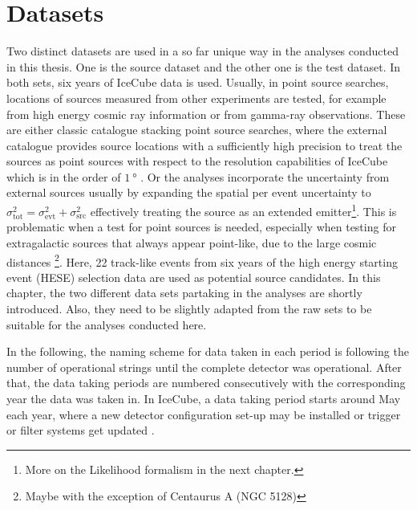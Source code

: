 \chapter{Datasets}
  \label{chp:datasets}

Two distinct datasets are used in a so far unique way in the analyses conducted in this thesis.
One is the source dataset and the other one is the test dataset.
In both sets, six years of IceCube data is used.
Usually, in point source searches, locations of sources measured from other experiments are tested, for example from high energy cosmic ray information or from gamma-ray observations.
These are either classic catalogue stacking point source searches, where the external catalogue provides source locations with a sufficiently high precision to treat the sources as point sources with respect to the resolution capabilities of IceCube which is in the order of $\SI{1}{\degree}$ .
Or the analyses incorporate the uncertainty from external sources usually by expanding the spatial per event uncertainty to $\sigma_\text{tot}^2 = \sigma_\text{evt}^2 + \sigma_\text{src}^2$ effectively treating the source as an extended emitter\footnote{More on the Likelihood formalism in the next chapter.}.
This is problematic when a test for point sources is needed, especially when testing for extragalactic sources that always appear point-like, due to the large cosmic distances \footnote{Maybe with the exception of Centaurus A (NGC 5128) }.
Here, 22 track-like events from six years of the high energy starting event (HESE) selection data are used as potential source candidates.
In this chapter, the two different data sets partaking in the analyses are shortly introduced.
Also, they need to be slightly adapted from the raw sets to be suitable for the analyses conducted here.

In the following, the naming scheme for data taken in each period is following the number of operational strings until the complete detector was operational.
After that, the data taking periods are numbered consecutively with the corresponding year the data was taken in.
In IceCube, a data taking period starts around May each year, where a new detector configuration set-up may be installed or trigger or filter systems get updated .

